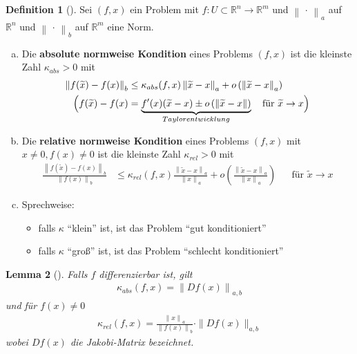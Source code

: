 \documentclass[ngerman,fontsize=11pt, paper=a4, parskip=half, titlepage=true, toc=bib]{scrbook}
\theoremstyle{definition}
\newtheorem{Def}{Definition}[section]		%
\theoremstyle{plain}
\newtheorem{Lem}[Def]{Lemma}		%
\newcommand{\R}{\mathds{R}}
\newcommand{\nn}[1]{\left\| #1 \right\|}
\newcommand{\subsectione}[1]{\subsection{#1} \addtocounter{Def}{1}}
\newenvironment{Leme}[1][]{ %
	\begin{Lem}[#1]
	}
	{
	\end{Lem}
	\addtocounter{subsection}{1}
}
\newenvironment{Defe}[1][]{ %
	\begin{Def}[#1]
	}
	{
	\end{Def}
	\addtocounter{subsection}{1}
}
\begin{document}
\begin{Defe}
	Sei $(f,x)$ ein Problem mit $f:U\subset \R^n \rightarrow \R^m$
	und $\nn{\,\cdot\,}_a$ auf $\R^n$ und $\nn{\,\cdot\,}_b$ auf $\R^m$ eine Norm.
	\begin{enumerate}[a)]
		\item Die \textbf{absolute normweise Kondition} eines Problems $(f,x)$ ist die kleinste Zahl 
		$\kappa _{abs} > 0 $ mit
		\begin{align}
		\nn{f(\widetilde{x})-f(x)}_b &\leq \kappa _{abs}(f,x) \nn{\widetilde{x}-x}_a
		+ o\left(\nn{\widetilde{x}-x}_a\right) \label{III.2.2} \\\nonumber
		\Bigl(f(\widetilde{x})- f(x) 
		&=\underbrace{ f'(x)(\widetilde{x}-x)\pm o\left(\nn{\widetilde{x}-x}\right)}_{Taylorentwicklung}
		\quad \text{für }\widetilde{x}\rightarrow x 
		\Bigr)
		\end{align}
		\item Die \textbf{relative normweise Kondition} eines Problems $(f,x)$  mit $x\neq 0, f(x) \neq 0$
		ist die kleinste Zahl 
		$\kappa _{rel} > 0 $ mit
		\begin{align}
		\frac{	\nn{f(\widetilde{x})-f(x)}_b }{\nn{f(x)}_b}
		&\leq \kappa _{rel}(f,x)\frac{ \nn{\widetilde{x}-x}_a}{\nn{x}_a}
		+ 
		o\left(\frac{\nn{\widetilde{x}-x}_a}{\nn{x}_a}\right) \label{III.2.3}
		&&	\text{für } \widetilde{x} \rightarrow x
		\end{align}
		\item Sprechweise:
		\begin{itemize}
			\item falls $\kappa$ \enquote{klein} ist, ist das Problem \enquote{gut konditioniert}
			\item falls $\kappa$ \enquote{groß} ist, ist das Problem \enquote{schlecht konditioniert}
		\end{itemize}
	\end{enumerate}
\end{Defe}

  \begin{Leme}\label{3.2.8}
  	Falls $f$ differenzierbar ist, gilt
  	\begin{gather}
  	\kappa_{abs}(f,x) = \nn{Df(x)}_{a,b} \label{III.2.4}
  	\end{gather}
  	und für $f(x) \neq 0$
  	\begin{gather}
  	\kappa_{rel}(f,x) = \frac{\nn{x}_a}{\nn{f(x)}_b}\cdot \|Df(x)\|_{a,b} \label{III.2.5}
  	\end{gather}
  	wobei $Df(x)$ die Jakobi-Matrix bezeichnet.
  \end{Leme}
  
\end{document}
